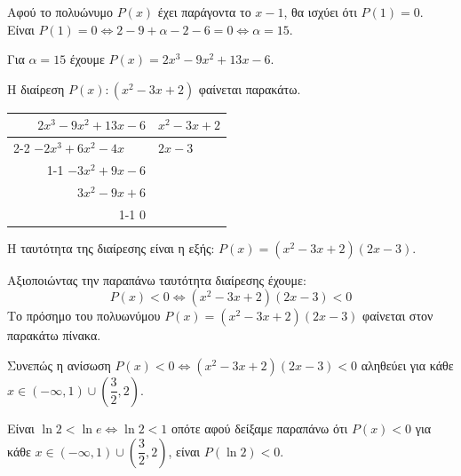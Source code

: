 \begin{alist}
\item Αφού το πολυώνυμο $P(x)$ έχει παράγοντα το $x - 1$, θα ισχύει ότι $P(1) = 0$. \\
Είναι $P(1) = 0 \Leftrightarrow 2 - 9 + \alpha - 2 - 6 = 0 \Leftrightarrow \alpha = 15$.
\item Για $\alpha = 15$ έχουμε $P(x) = 2x^3 - 9x^2 + 13x - 6$.
\begin{rlist}
\item Η διαίρεση $P(x) : (x^2 - 3x + 2)$ φαίνεται παρακάτω.
\begin{center}
\begin{tabular}{r|l}
$2x^3 - 9x^2 + 13x - 6$ & $x^2 - 3x + 2$ \\ \cline{2-2}
$-2x^3 + 6x^2 - 4x \phantom{{} - 6}$ & $2x - 3$ \\ \cline{1-1}
$-3x^2 + 9x - 6$ & \\
$3x^2 - 9x + 6$ & \\ \cline{1-1}
$0$ &
\end{tabular}
\end{center}
Η ταυτότητα της διαίρεσης είναι η εξής: $P(x) = (x^2 - 3x + 2)(2x - 3)$.
\item Αξιοποιώντας την παραπάνω ταυτότητα διαίρεσης έχουμε:
\[P(x) < 0 \Leftrightarrow (x^2 - 3x + 2)(2x - 3) < 0\]
Το πρόσημο του πολυωνύμου $P(x) = (x^2 - 3x + 2)(2x - 3)$ φαίνεται στον παρακάτω πίνακα.
\begin{center}
\end{center}
Συνεπώς η ανίσωση $P(x) < 0 \Leftrightarrow (x^2 - 3x + 2)(2x - 3) < 0$ αληθεύει για κάθε $x \in (-\infty, 1) \cup \left(\dfrac{3}{2}, 2\right)$.
\item Είναι $\ln 2 < \ln e \Leftrightarrow \ln 2 < 1$ οπότε αφού δείξαμε παραπάνω ότι $P(x) < 0$ για κάθε $x \in (-\infty, 1) \cup \left(\dfrac{3}{2}, 2\right)$, είναι $P(\ln 2) < 0$.
\end{rlist}
\end{alist}

